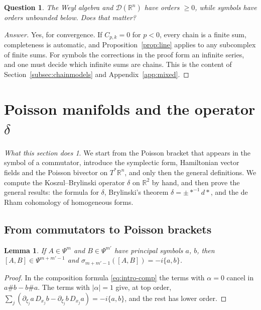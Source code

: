 \documentclass[11pt,oneside,reqno]{article}
\newcommand{\R}{\mathbb R}
\newcommand{\cD}{\mathcal D}
\newcommand{\pa}{\partial}
\theoremstyle{plain}
\newtheorem{lemma}[theorem]{Lemma}
\newtheorem{question}[theorem]{Question}
\theoremstyle{definition}
\theoremstyle{remark}
\newtheorem*{whatdoes}{What this section does}
\newenvironment{answer}{\begin{proof}[Answer]}{\end{proof}}
\begin{document}
\begin{question}
The Weyl algebra and \(\cD(\R^n)\) have orders \(\ge0\), while symbols have orders
unbounded below. Does that matter?
\end{question}
\begin{answer}
Yes, for convergence. If \(C_{p,k}=0\) for \(p<0\), every chain is a finite sum,
completeness is automatic, and Proposition~\ref{prop:line} applies to any
subcomplex of finite sums. For symbols the corrections in the proof form an
infinite series, and one must decide which infinite sums are chains. This
is the content of Section~\ref{subsec:chainmodels} and Appendix~\ref{app:mixed}.
\end{answer}

\section{Poisson manifolds and the operator \texorpdfstring{\(\delta\)}{delta}}
\label{sec:poisson}

\begin{whatdoes}
We start from the Poisson bracket that appears in the symbol of a
commutator, introduce the symplectic form, Hamiltonian vector fields and
the Poisson bivector on \(T^*\R^n\), and only then the general definitions.
We compute the Koszul--Brylinski operator \(\delta\) on \(\R^2\) by hand, and
then prove the general results: the formula for \(\delta\), Brylinski's
theorem \(\delta=\pm*^{-1}d*\), and the de Rham cohomology of homogeneous
forms.
\end{whatdoes}

\subsection{From commutators to Poisson brackets}\label{subsec:fromcomm}
\begin{lemma}\label{lem:commutator}
If \(A\in\Psi^m\) and \(B\in\Psi^{m'}\) have principal symbols \(a\), \(b\), then
\([A,B]\in\Psi^{m+m'-1}\) and \(\sigma_{m+m'-1}([A,B])=-i\{a,b\}\).
\end{lemma}

\begin{proof}
In the composition formula \eqref{eq:intro-comp} the terms with \(\alpha=0\)
cancel in \(a\#b-b\#a\). The terms with \(|\alpha|=1\) give, at top order,
\(\sum_j(\pa_{\xi_j}a\,D_{x_j}b-\pa_{\xi_j}b\,D_{x_j}a)=-i\{a,b\}\), and the rest has
lower order.
\end{proof}
\end{document}
